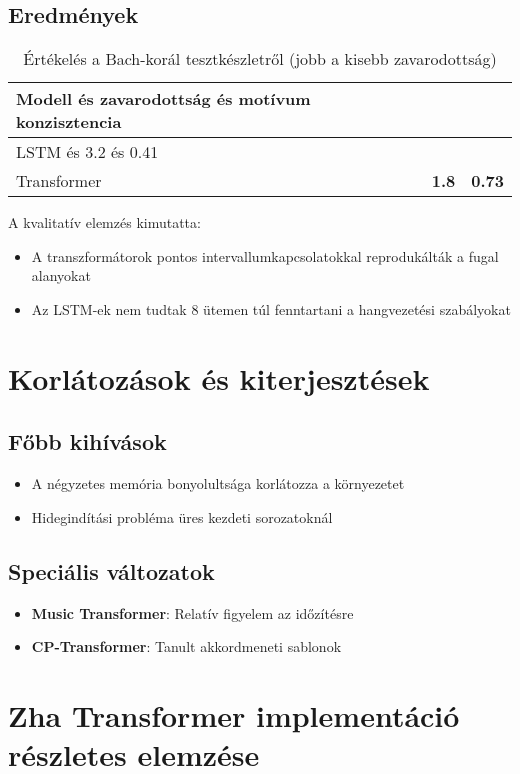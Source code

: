 \subsection{Eredmények}
\begin{table}
\centering
\begin{tabular}{lcc}
\hline
Modell és zavarodottság és motívum konzisztencia \\
\hline
LSTM és 3.2 és 0.41 \\
Transformer & \textbf{1.8} & \textbf{0.73} \\
\hline
\end{tabular}
\caption{Értékelés a Bach-korál tesztkészletről (jobb a kisebb zavarodottság)}
\end{table}

A kvalitatív elemzés kimutatta:
\begin{itemize}
    \item A transzformátorok pontos intervallumkapcsolatokkal reprodukálták a fugal alanyokat
    \item Az LSTM-ek nem tudtak 8 ütemen túl fenntartani a hangvezetési szabályokat
\end{itemize}

\section{Korlátozások és kiterjesztések}
\subsection{Főbb kihívások}
\begin{itemize}
    \item A négyzetes memória bonyolultsága korlátozza a környezetet
    \item Hidegindítási probléma üres kezdeti sorozatoknál
\end{itemize}

\subsection{Speciális változatok}
\begin{itemize}
    \item \textbf{Music Transformer}: Relatív figyelem az időzítésre
    \item \textbf{CP-Transformer}: Tanult akkordmeneti sablonok
\end{itemize}

\section{Zha Transformer implementáció részletes elemzése}
